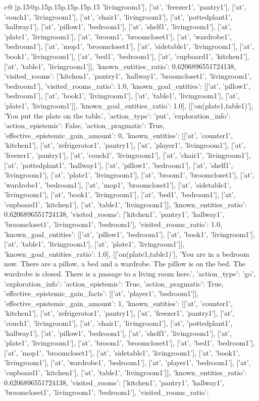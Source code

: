 \documentclass{article}
\begin{document}
{\begin{supertabular}{c@{$\;$}|p{.15\linewidth}@{}p{.15\linewidth}p{.15\linewidth}p{.15\linewidth}p{.15\linewidth}p{.15\linewidth}}
{{{'livingroom1'], ['at', 'freezer1', 'pantry1'], ['at', 'couch1', 'livingroom1'], ['at', 'chair1', 'livingroom1'], ['at', 'pottedplant1', 'hallway1'], ['at', 'pillow1', 'bedroom1'], ['at', 'shelf1', 'livingroom1'], ['at', 'plate1', 'livingroom1'], ['at', 'broom1', 'broomcloset1'], ['at', 'wardrobe1', 'bedroom1'], ['at', 'mop1', 'broomcloset1'], ['at', 'sidetable1', 'livingroom1'], ['at', 'book1', 'livingroom1'], ['at', 'bed1', 'bedroom1'], ['at', 'cupboard1', 'kitchen1'], ['at', 'table1', 'livingroom1']], 'known_entities_ratio': 0.6206896551724138, 'visited_rooms': ['kitchen1', 'pantry1', 'hallway1', 'broomcloset1', 'livingroom1', 'bedroom1'], 'visited_rooms_ratio': 1.0, 'known_goal_entities': [['at', 'pillow1', 'bedroom1'], ['at', 'book1', 'livingroom1'], ['at', 'table1', 'livingroom1'], ['at', 'plate1', 'livingroom1']], 'known_goal_entities_ratio': 1.0}}], [['on(plate1,table1)'], 'You put the plate on the table.', {'action_type': 'put', 'exploration_info': {'action_epistemic': False, 'action_pragmatic': True, 'effective_epistemic_gain_amount': 0, 'known_entities': [['at', 'counter1', 'kitchen1'], ['at', 'refrigerator1', 'pantry1'], ['at', 'player1', 'livingroom1'], ['at', 'freezer1', 'pantry1'], ['at', 'couch1', 'livingroom1'], ['at', 'chair1', 'livingroom1'], ['at', 'pottedplant1', 'hallway1'], ['at', 'pillow1', 'bedroom1'], ['at', 'shelf1', 'livingroom1'], ['at', 'plate1', 'livingroom1'], ['at', 'broom1', 'broomcloset1'], ['at', 'wardrobe1', 'bedroom1'], ['at', 'mop1', 'broomcloset1'], ['at', 'sidetable1', 'livingroom1'], ['at', 'book1', 'livingroom1'], ['at', 'bed1', 'bedroom1'], ['at', 'cupboard1', 'kitchen1'], ['at', 'table1', 'livingroom1']], 'known_entities_ratio': 0.6206896551724138, 'visited_rooms': ['kitchen1', 'pantry1', 'hallway1', 'broomcloset1', 'livingroom1', 'bedroom1'], 'visited_rooms_ratio': 1.0, 'known_goal_entities': [['at', 'pillow1', 'bedroom1'], ['at', 'book1', 'livingroom1'], ['at', 'table1', 'livingroom1'], ['at', 'plate1', 'livingroom1']], 'known_goal_entities_ratio': 1.0}}], [['on(plate1,table1)'], 'You are in a bedroom now. There are a pillow, a bed and a wardrobe. The pillow is on the bed. The wardrobe is closed. There is a passage to a living room here.', {'action_type': 'go', 'exploration_info': {'action_epistemic': True, 'action_pragmatic': True, 'effective_epistemic_gain_facts': [['at', 'player1', 'bedroom1']], 'effective_epistemic_gain_amount': 1, 'known_entities': [['at', 'counter1', 'kitchen1'], ['at', 'refrigerator1', 'pantry1'], ['at', 'freezer1', 'pantry1'], ['at', 'couch1', 'livingroom1'], ['at', 'chair1', 'livingroom1'], ['at', 'pottedplant1', 'hallway1'], ['at', 'pillow1', 'bedroom1'], ['at', 'shelf1', 'livingroom1'], ['at', 'plate1', 'livingroom1'], ['at', 'broom1', 'broomcloset1'], ['at', 'bed1', 'bedroom1'], ['at', 'mop1', 'broomcloset1'], ['at', 'sidetable1', 'livingroom1'], ['at', 'book1', 'livingroom1'], ['at', 'wardrobe1', 'bedroom1'], ['at', 'player1', 'bedroom1'], ['at', 'cupboard1', 'kitchen1'], ['at', 'table1', 'livingroom1']], 'known_entities_ratio': 0.6206896551724138, 'visited_rooms': ['kitchen1', 'pantry1', 'hallway1', 'broomcloset1', 'livingroom1', 'bedroom1'], 'visited_rooms_ratio': }}}
\end{supertabular}}
\end{document}
